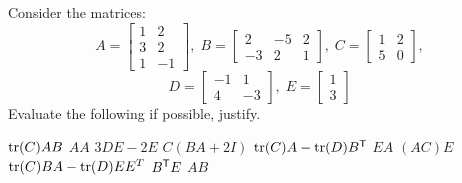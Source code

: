 
\begin{Exercise}[
name={},
title={}, 
difficulty=0,
origin={\cite{YL}}]
Consider the matrices:
\[
A =\begin{bmatrix}
1 & 2 \\
3 & 2 \\
1 & -1
\end{bmatrix},\; B=
\begin{bmatrix}
2 & -5 & 2 \\
-3 & 2 & 1
\end{bmatrix},\; 
C = \begin{bmatrix}
1 & 2 \\
5 & 0
\end{bmatrix},
\]
\[D=
\begin{bmatrix}
-1 & 1 \\
4 & -3
\end{bmatrix},\; E=
\begin{bmatrix}
1 \\
3
\end{bmatrix}
\]
Evaluate the following if possible, justify.
\begin{multicols}{2}
\Question $\operatorname{tr}(C)AB$
\Question $AA$
\Question $3DE-2E$
\Question $C(BA+2I)$
\Question $\operatorname{tr}(C)A-\operatorname{tr}(D){{B}^{\mathsf{T}}}$ 
\Question $EA$
\Question $(AC)E$
\Question $\operatorname{tr}(C)BA - \operatorname{tr}(D)EE^T$
\Question ${{B}^{\mathsf{T}}}E$
\Question $AB$
\EndCurrentQuestion
\end{multicols}
\end{Exercise}

